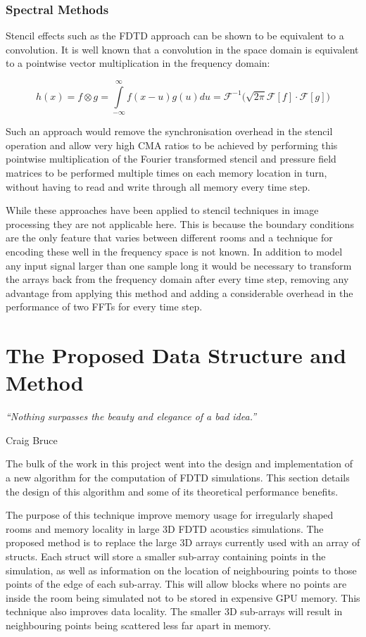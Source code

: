 \documentclass[12pt,a4paper]{report}
\begin{document}
\subsection{Spectral Methods}

Stencil effects such as the FDTD approach can be shown to be equivalent to a convolution. It is well known that a convolution in the space domain is equivalent to a pointwise vector multiplication in the frequency domain:

\begin{equation}
h(x) = f \otimes g = \int\limits_{-\infty}^{\infty}f(x-u)g(u) du = \mathcal{F}^{-1}\Big(\sqrt{2\pi} \mathcal{F}[f] \cdot \mathcal{F}[g]\Big)
\label{equation:convolution}
\end{equation}

Such an approach would remove the synchronisation overhead in the stencil operation and allow very high CMA ratios to be achieved by performing this pointwise multiplication of the Fourier transformed stencil and pressure field matrices to be performed multiple times on each memory location in turn, without having to read and write through all memory every time step.

While these approaches have been applied to stencil techniques in image processing \cite{ref:vision} they are not applicable here. This is because the boundary conditions are the only feature that varies between different rooms and a technique for encoding these well in the frequency space is not known. In addition to model any input signal larger than one sample long it would be necessary to transform the arrays back from the frequency domain after every time step, removing any advantage from applying this method and adding a considerable overhead in the performance of two FFTs for every time step.

\chapter{The Proposed Data Structure and Method}
\label{chapter:proposition}

\epigraph{\itshape ``Nothing surpasses the beauty and elegance of a bad idea.''}{Craig Bruce}

The bulk of the work in this project went into the design and implementation of a new algorithm for the computation of FDTD simulations. This section details the design of this algorithm and some of its theoretical performance benefits.

The purpose of this technique improve memory usage for irregularly shaped rooms and memory locality in large 3D FDTD acoustics simulations. The proposed method is to replace the large 3D arrays currently used with an array of structs. Each struct will store a smaller sub-array containing points in the simulation, as well as information on the location of neighbouring points to those points of the edge of each sub-array. This will allow blocks where no points are inside the room being simulated not to be stored in expensive GPU memory. This technique also improves data locality. The smaller 3D sub-arrays will result in neighbouring points being scattered less far apart in memory.
\end{document}
